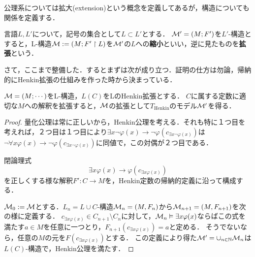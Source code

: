 \documentclass[uplatex, dvipdfmx]{jsreport}
\begin{document}
公理系については拡大(extension)という概念を定義してあるが，構造についても関係を定義する．
\begin{definition}
    言語$L,L'$について，記号の集合として$L\subset L'$とする．
    $\mathcal{M}'=(M;F')$を$L'$-構造とすると，L-構造$\mathcal{M}:=(M;F'\restriction L)$を$\mathcal{M}'$の$L$への\textbf{縮小}といい，逆に見たものを\textbf{拡張}という．
\end{definition}

さて，ここまで整備した．するとまずは次が成り立つ．証明の仕方は勿論，帰納的にHenkin拡張の仕組みを作った時から決まっている．
\begin{lemma}
    $\mathcal{M}=(M;\cdots)$をL-構造，$L(C)$をLのHenkin拡張とする．
    $C$に属する定数に適切な$M$への解釈を拡張すると，$\mathcal{M}$の拡張として$T_\mathrm{Henkin}$のモデル$\mathcal{M}'$を得る．
\end{lemma}
\begin{proof}
    量化公理は常に正しいから，Henkin公理を考える．それも特に１つ目を考えれば，２つ目は１つ目により$\exists x\lnot\varphi(x)\to\lnot\varphi(c_{\exists x\lnot\varphi(x)})$は
    $\lnot\forall x\varphi(x)\to\lnot\varphi(c_{\exists x\lnot\varphi(x)})$に同値で，この対偶が２つ目である．

    閉論理式\[ \exists x\varphi(x) \to \varphi(c_{\exists x\varphi(x)}) \]
    を正しくする様な解釈$F':C\to M$を，Henkin定数の帰納的定義に沿って構成する．
    
    $\mathcal{M}_0:=\mathcal{M}$とする．$L_n=L\cup C$-構造$\mathcal{M}_n=(M,F_n)$から$\mathcal{M}_{n+1}=(M,F_{n+1})$を次の様に定義する．
    $c_{\exists x\varphi(x)}\in C_{n+1}\setminus C_n$に対して，$\mathcal{M}_n\vDash \exists x\varphi(x)$ならばこの式を満たす$a\in M$を任意に一つとり，$F_{n+1}(c_{\exists x\varphi(x)})=a$と定める．
    そうでないなら，任意の$M$の元を$F(c_{\exists x\varphi(x)})$とする．
    この定義により得た$\mathcal{M}'=\cup_{n\in\mathbb{N}}\mathcal{M}_n$は$L(C)$-構造で，Henkin公理を満たす．
\end{proof}
\end{document}
